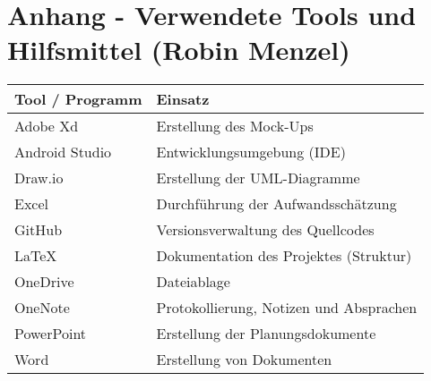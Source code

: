\section{Anhang - Verwendete Tools und Hilfsmittel (Robin Menzel)}
\label{instal}

\begin{tabular}{|p{5cm}|p{9cm}|}
\hline
{\textbf{Tool / Programm}} & {\textbf{Einsatz}} \\ \hline
Adobe Xd & Erstellung des Mock-Ups\\ \hline
Android Studio & Entwicklungsumgebung (IDE) \\ \hline
Draw.io & Erstellung der UML-Diagramme \\ \hline
Excel & Durchführung der Aufwandsschätzung\\ \hline
GitHub & Versionsverwaltung des Quellcodes\\ \hline
LaTeX & Dokumentation des Projektes (Struktur)\\ \hline
OneDrive & Dateiablage \\ \hline
OneNote & Protokollierung, Notizen und Absprachen\\ \hline
PowerPoint & Erstellung der Planungsdokumente\\ \hline
Word & Erstellung von Dokumenten \\ \hline
\end{tabular}
